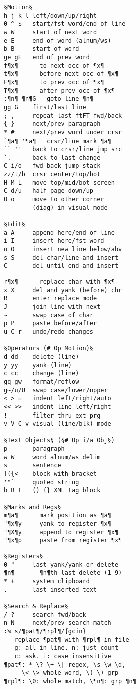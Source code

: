 \documentclass{article}
\begin{document}
\setlength{\columnsep}{7mm}
\begin{multicols}{4}
\begin{lstlisting}
§Motion§
h j k l left/down/up/right
0 ^ $   start/fst word/end of line
w W     start of next word
e E     end of word (alnum/ws)
b B     start of word
ge gE   end of prev word
f¶x¶      to next occ of ¶x¶
t¶x¶      before next occ of ¶x¶
F¶x¶      to prev occ of ¶x¶
T¶x¶      after prev occ of ¶x¶
:¶n¶ ¶n¶G   goto line ¶n¶
gg G    first/last line
; ,     repeat last ftFT fwd/back
{ }     next/prev paragraph
* #     next/prev word under crsr
`¶a¶ '¶a¶   crsr/line mark ¶a¶
`` ''   back to crsr/line jmp src
`.      back to last change
C-i/o   fwd back jump stack
zz/t/b  crsr center/top/bot
H M L   move top/mid/bot screen
C-d/u   half page down/up
O o     move to other corner
        (diag) in visual mode

§Edit§
a A     append here/end of line
i I     insert here/fst word
o O     insert new line below/abv
s S     del char/line and insert
C       del until end and insert
\end{lstlisting}
\begin{lstlisting}
r¶x¶      replace char with ¶x¶
x X     del and yank (before) chr
R       enter replace mode
J       join line with next
~       swap case of char
p P     paste before/after
u C-r   undo/redo changes

§Operators (# Op Motion)§
d dd    delete (line)
y yy    yank (line)
c cc    change (line)
gq gw   format/reflow
g~/u/U  swap case/lower/upper
< > =   indent left/right/auto
<< >>   indent line left/right
!       filter thru ext prg
v V C-v visual (line/blk) mode

§Text Objects§ (§# Op i/a Obj§)
p       paragraph
w W     word alnum/ws delim
s       sentence
[({<    block with bracket
'"`     quoted string
b B t   () {} XML tag block

§Marks and Regs§
m¶a¶      mark position as ¶a¶
"¶x¶y     yank to register ¶x¶
"¶X¶y     append to register ¶x¶
"¶x¶p     paste from register ¶x¶
\end{lstlisting}
\begin{lstlisting}
§Registers§
0 "     last yank/yank or delete
¶n¶       ¶n¶th-last delete (1-9)
* +     system clipboard
.       last inserted text

§Search & Replace§
/ ?     search fwd/back
n N     next/prev search match
:% s/¶pat¶/¶rpl¶/{gcin}
   replace ¶pat¶ with ¶rpl¶ in file
   g: all in line. n: just count
   c: ask. i: case insensitive
¶pat¶: * \? \+ \| regex, \s \w \d,
     \< \> whole word, \( \) grp
¶rpl¶: \0: whole match, \¶n¶: grp ¶n¶


\end{lstlisting}
\end{multicols}
\end{document}
